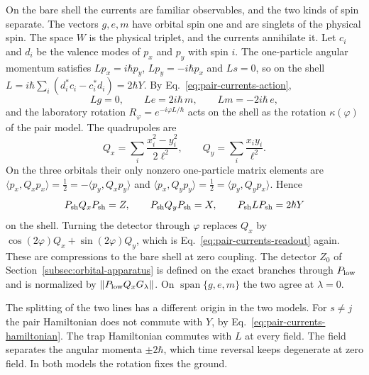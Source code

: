 \documentclass[11pt]{article}
\theoremstyle{definition}
\DeclareMathOperator{\Span}{span}
\begin{document}
On the bare shell the currents are familiar observables, and the two kinds of spin separate. The vectors $g,e,m$ have orbital spin one and are singlets of the physical spin. The space $W$ is the physical triplet, and the currents annihilate it. Let $c_i$ and $d_i$ be the valence modes of $p_x$ and $p_y$ with spin $i$. The one-particle angular momentum satisfies $Lp_x=i\hbar p_y$, $Lp_y=-i\hbar p_x$ and $Ls=0$, so on the shell $L=i\hbar\sum_i(d_i^*c_i-c_i^*d_i)=2\hbar Y$. By Eq.~\eqref{eq:pair-currents-action},
\begin{equation}
 Lg=0,\qquad Le=2i\hbar\,m,\qquad Lm=-2i\hbar\,e,
 \label{eq:pair-currents-angular-momentum}
\end{equation}
and the laboratory rotation $R_\varphi=e^{-i\varphi L/\hbar}$ acts on the shell as the rotation $\kappa(\varphi)$ of the pair model. The quadrupoles are
\begin{equation}
 Q_x=\sum_i\frac{x_i^2-y_i^2}{2\ell^2},\qquad Q_y=\sum_i\frac{x_iy_i}{\ell^2}.
 \label{eq:pair-currents-quadrupoles}
\end{equation}
On the three orbitals their only nonzero one-particle matrix elements are $\langle p_x,Q_xp_x\rangle=\tfrac12=-\langle p_y,Q_xp_y\rangle$ and $\langle p_x,Q_yp_y\rangle=\tfrac12=\langle p_y,Q_yp_x\rangle$. Hence
\begin{equation}
 P_{\rm sh}Q_xP_{\rm sh}=Z,\qquad P_{\rm sh}Q_yP_{\rm sh}=X,\qquad P_{\rm sh}LP_{\rm sh}=2\hbar Y
 \label{eq:pair-currents-shell}
\end{equation}
on the shell. Turning the detector through $\varphi$ replaces $Q_x$ by $\cos(2\varphi)Q_x+\sin(2\varphi)Q_y$, which is Eq.~\eqref{eq:pair-currents-readout} again. These are compressions to the bare shell at zero coupling. The detector $Z_0$ of Section~\ref{subsec:orbital-apparatus} is defined on the exact branches through $P_{\rm low}$ and is normalized by $\|P_{\rm low}Q_xG_\lambda\|$. On $\Span\{g,e,m\}$ the two agree at $\lambda=0$.

The splitting of the two lines has a different origin in the two models. For $s\ne j$ the pair Hamiltonian does not commute with $Y$, by Eq.~\eqref{eq:pair-currents-hamiltonian}. The trap Hamiltonian commutes with $L$ at every field. The field separates the angular momenta $\pm2\hbar$, which time reversal keeps degenerate at zero field. In both models the rotation fixes the ground.
\end{document}
